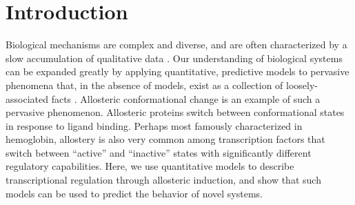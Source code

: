 \section*{Introduction }

Biological mechanisms are complex and diverse, and are often characterized by a
slow accumulation of qualitative data . Our understanding of biological
systems can be expanded greatly by applying quantitative, predictive models to
pervasive phenomena that, in the absence of models, exist as a collection of
loosely-associated facts . Allosteric conformational change is an example of
such a pervasive phenomenon. Allosteric proteins switch between conformational
states in response to ligand binding. Perhaps most famously characterized in
hemoglobin, allostery is also very common among transcription factors that
switch between ``active'' and ``inactive'' states with significantly different
regulatory capabilities.  Here, we use quantitative models to describe
transcriptional regulation through allosteric induction, and show that such
models can be used to predict the behavior of novel systems.

